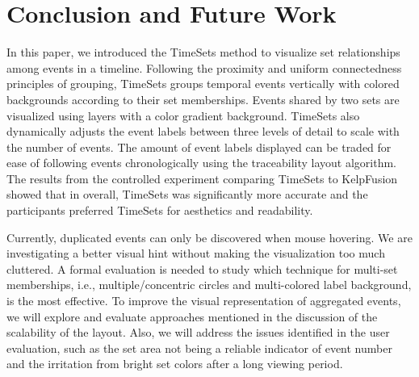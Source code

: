 \section{Conclusion and Future Work}

In this paper, we introduced the TimeSets method to visualize set relationships among events in a timeline. Following the proximity and uniform connectedness principles of grouping, TimeSets groups temporal events vertically with colored backgrounds according to their set memberships. Events shared by two sets are visualized using layers with a color gradient background. TimeSets also dynamically adjusts the event labels between three levels of detail to scale with the number of events. The amount of event labels displayed can be traded for ease of following events chronologically using the traceability layout algorithm. The results from the controlled experiment comparing TimeSets to KelpFusion showed that in overall, TimeSets was significantly more accurate and the participants preferred TimeSets for aesthetics and readability.

Currently, duplicated events can only be discovered when mouse hovering. We are investigating a better visual hint without making the visualization too much cluttered. A formal evaluation is needed to study which technique for multi-set memberships, i.e., multiple/concentric circles and multi-colored label background, is the most effective. To improve the visual representation of aggregated events, we will explore and evaluate approaches mentioned in the discussion of the scalability of the layout. Also, we will address the issues identified in the user evaluation, such as the set area not being a reliable indicator of event number and the irritation from bright set colors after a long viewing period. 